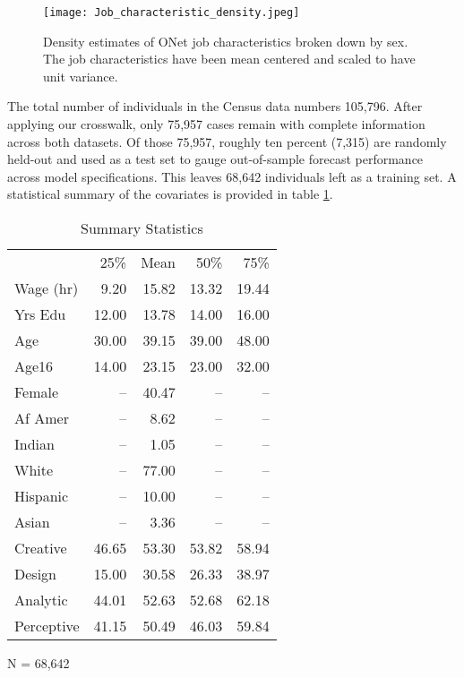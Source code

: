 \documentclass[12pt]{article}
\begin{document}
\begin{figure}[t!]
  \texttt{[image: Job\_characteristic\_density.jpeg]}
  \caption{Density estimates of ONet job characteristics broken down by
  sex. The job characteristics have been mean centered and scaled to
  have unit variance.}
  \label{fig:JobChar_vs_sex}
\end{figure}

The total number of individuals in the Census data numbers 105,796.
After applying our crosswalk, only 75,957 cases remain with complete
information across both datasets. Of those 75,957, roughly ten percent
(7,315) are randomly held-out and used as a test set to gauge
out-of-sample forecast performance across model specifications.
This leaves 68,642 individuals left as a training set. A statistical summary
of the covariates is provided in table \ref{tbl:census_cov_summary}.

\begin{table} \centering
  \caption{Summary Statistics}
  \begin{threeparttable}
    \begin{tabular}[l]{l r r r r}
  \cmidrule{1-5}

              & 25\%   & Mean & 50\% & 75\%    \\
  \cmidrule{1-5}
  Wage (hr)   & 9.20  & 15.82 & 13.32  & 19.44 \\
  Yrs Edu     & 12.00 & 13.78 & 14.00  & 16.00 \\
  Age         & 30.00 & 39.15 & 39.00  & 48.00 \\
  Age16       & 14.00 & 23.15 & 23.00  & 32.00 \\
  Female      & --    & 40.47 & --     & --    \\
  Af Amer     & --    &  8.62 & --     & --    \\
  Indian      & --    &  1.05 & --     & --    \\
  White       & --    & 77.00 & --     & --    \\
  Hispanic    & --    & 10.00 & --     & --    \\
  Asian       & --    &  3.36 & --     & --    \\
  Creative    & 46.65 & 53.30 & 53.82  & 58.94 \\
  Design      & 15.00 & 30.58 & 26.33  & 38.97 \\
  Analytic    & 44.01 & 52.63 & 52.68  & 62.18 \\
  Perceptive  & 41.15 & 50.49 & 46.03  & 59.84 \\

  \hline
    \end{tabular}
    \begin{tablenotes}
      \item{\footnotesize N = 68,642}
    \end{tablenotes} \label{tbl:census_cov_summary}
  \end{threeparttable}
\end{table}
\end{document}
